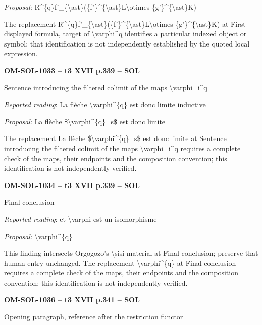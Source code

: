 \emph{Proposal}: R\textasciicircum{}\{q\}f'\_\{\textbackslash{}ast\}(\{f'\}\textasciicircum{}\{\textbackslash{}ast\}L\textbackslash{}otimes \{g'\}\textasciicircum{}\{\textbackslash{}ast\}K)\par
The replacement R\textasciicircum{}\{q\}f'\_\{\textbackslash{}ast\}(\{f'\}\textasciicircum{}\{\textbackslash{}ast\}L\textbackslash{}otimes \{g'\}\textasciicircum{}\{\textbackslash{}ast\}K) at First displayed formula, target of \textbackslash{}varphi\textasciicircum{}q identifies a particular indexed object or symbol; that identification is not independently established by the quoted local expression.\par
\par\noindent\textbf{OM-SOL-1033 -- t3 XVII p.339 -- SOL}\par
Sentence introducing the filtered colimit of the maps \textbackslash{}varphi\_i\textasciicircum{}q\par
\emph{Reported reading}: La flèche \textbackslash{}varphi\textasciicircum{}\{q\} est donc limite inductive\par
\emph{Proposal}: La flèche \$\textbackslash{}varphi\textasciicircum{}\{q\}\_s\$ est donc limite\par
The replacement La flèche \$\textbackslash{}varphi\textasciicircum{}\{q\}\_s\$ est donc limite at Sentence introducing the filtered colimit of the maps \textbackslash{}varphi\_i\textasciicircum{}q requires a complete check of the maps, their endpoints and the composition convention; this identification is not independently verified.\par
\par\noindent\textbf{OM-SOL-1034 -- t3 XVII p.339 -- SOL}\par
Final conclusion\par
\emph{Reported reading}: et \textbackslash{}varphi est un isomorphisme\par
\emph{Proposal}: \textbackslash{}varphi\textasciicircum{}\{q\}\par
This finding intersects Orgogozo's \textbackslash{}sisi material at Final conclusion; preserve that human entry unchanged. The replacement \textbackslash{}varphi\textasciicircum{}\{q\} at Final conclusion requires a complete check of the maps, their endpoints and the composition convention; this identification is not independently verified.\par
\par\noindent\textbf{OM-SOL-1036 -- t3 XVII p.341 -- SOL}\par
Opening paragraph, reference after the restriction functor\par
